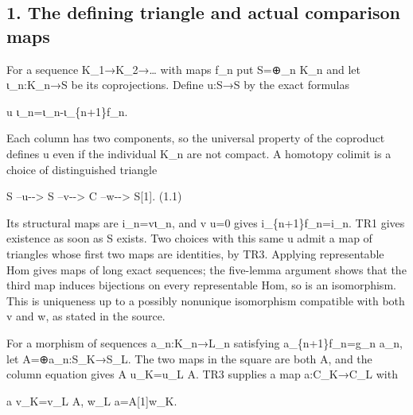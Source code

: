\documentclass[11pt]{article}
\begin{document}
\subsection{1. The defining triangle and actual comparison maps}\label{proofs-10139-10427-the-defining-triangle-and-actual-comparison-maps}

For a sequence K\_\allowbreak{}1\allowbreak{}→K\_\allowbreak{}2\allowbreak{}→… with maps f\_\allowbreak{}n put S\allowbreak{}=\allowbreak{}⊕\_\allowbreak{}n K\_\allowbreak{}n and let ι\_\allowbreak{}n:\allowbreak{}K\_\allowbreak{}n\allowbreak{}→S be its coprojections. Define u:\allowbreak{}S\allowbreak{}→S by the exact formulas

u ι\_\allowbreak{}n\allowbreak{}=ι\_\allowbreak{}n-ι\_\allowbreak{}\{n\allowbreak{}+1\}f\_\allowbreak{}n.

Each column has two components,\allowbreak{} so the universal property of the coproduct defines u even if the individual K\_\allowbreak{}n are not compact. A homotopy colimit is a choice of distinguished triangle

S --u-\allowbreak{}-> S --v-\allowbreak{}-> C --w-\allowbreak{}-> S[1]\allowbreak{}. (1.1)\allowbreak{}

Its structural maps are i\_\allowbreak{}n\allowbreak{}=vι\_\allowbreak{}n,\allowbreak{} and v u\allowbreak{}=0 gives i\_\allowbreak{}\{n\allowbreak{}+1\}f\_\allowbreak{}n\allowbreak{}=i\_\allowbreak{}n. TR1 gives existence as soon as S exists. Two choices with this same u admit a map of triangles whose first two maps are identities,\allowbreak{} by TR3. Applying representable Hom gives maps of long exact sequences; the five-lemma argument shows that the third map induces bijections on every representable Hom,\allowbreak{} so is an isomorphism. This is uniqueness up to a possibly nonunique isomorphism compatible with both v and w,\allowbreak{} as stated in the source.

For a morphism of sequences a\_\allowbreak{}n:\allowbreak{}K\_\allowbreak{}n\allowbreak{}→L\_\allowbreak{}n satisfying a\_\allowbreak{}\{n\allowbreak{}+1\}f\_\allowbreak{}n\allowbreak{}=g\_\allowbreak{}n a\_\allowbreak{}n,\allowbreak{} let A\allowbreak{}=\allowbreak{}⊕a\_\allowbreak{}n:\allowbreak{}S\_\allowbreak{}K\allowbreak{}→S\_\allowbreak{}L. The two maps in the square are both A,\allowbreak{} and the column equation gives A u\_\allowbreak{}K\allowbreak{}=u\_\allowbreak{}L A. TR3 supplies a map a:\allowbreak{}C\_\allowbreak{}K\allowbreak{}→C\_\allowbreak{}L with

a v\_\allowbreak{}K\allowbreak{}=v\_\allowbreak{}L A,\allowbreak{} w\_\allowbreak{}L a\allowbreak{}=A[1]\allowbreak{}w\_\allowbreak{}K.
\end{document}
